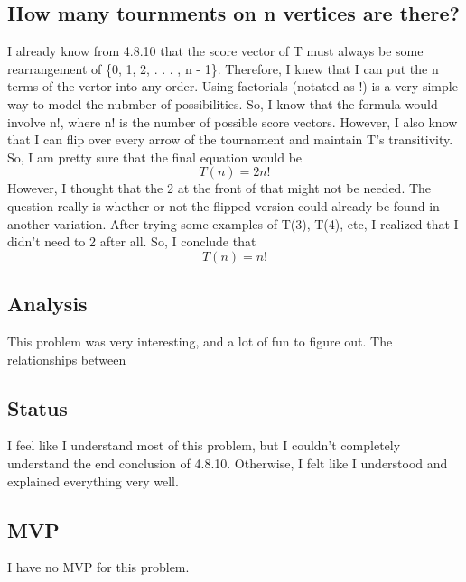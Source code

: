 \documentclass[11pt]{article} %
\newcommand\tab[1][1cm]{\hspace*{#1}}
\begin{document}
\subsection*{How many tournments on n vertices are there?}
\tab I already know from 4.8.10 that the score vector of T must always be some rearrangement of \{0, 1, 2, . . . , n - 1\}. Therefore, I knew that I can put the n terms of the vertor into any order. Using factorials (notated as !) is a very simple way to model the nubmber of possibilities. So, I know that the formula would involve n!, where n! is the number of possible score vectors. However, I also know that I can flip over every arrow of the tournament and maintain T's transitivity. So, I am pretty sure that the final equation would be 
\begin{displaymath} T(n) = 2n! \end{displaymath} 
\tab However, I thought that the 2 at  the front of that might not be needed. The question really is whether or not the flipped version could already be found in another variation. After trying some examples of T(3), T(4), etc, I realized that I didn't need to 2 after all. So, I conclude that \begin{displaymath} T(n)=n! \end{displaymath}

\subsection*{Analysis}
\tab This problem was very interesting, and a lot of fun to figure out. The relationships between 

\subsection*{Status}
\tab I feel like I understand most of this problem, but I couldn't completely understand the end conclusion of 4.8.10. Otherwise, I felt like I understood and explained everything very well. 

\subsection*{MVP}
\tab I have no MVP for this problem.
\end{document}
